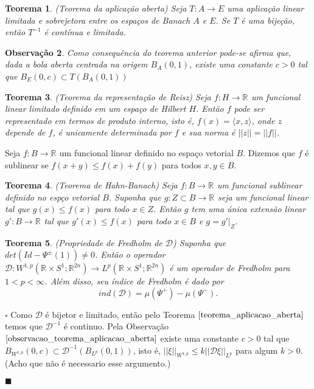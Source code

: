 \documentclass[12pt]{book}
\newtheorem{teorema}{Teorema}[section]
\newtheorem{observacao}[teorema]{Observação}
\newenvironment{prova}[1]{$\square$ #1}{\hfill$\blacksquare$}
\newcommand{\circulo}{S^{1}}
\newcommand{\diferencialmapafloerabrev}{\mathcal{D}}
\newcommand{\espacoLpcontradominio}[2]{L^{p}(#1;#2)}
\newcommand{\espacosobolevcontradominio}[2]{W^{1,p}(#1;#2)}
\newcommand{\norma}[1]{||#1||}
\newcommand{\normaLp}[1]{||#1||_{L^{p}}}
\newcommand{\normaWp}[1]{||#1||_{W^{1,p}}}
\newcommand{\produtointerno}[2]{\langle #1, #2 \rangle}
\newcommand{\retacartesianocirculo}{\real{} \times \circulo}
\newcommand{\real}[1]{\mathbb{R}^{#1}}
\newcommand{\reta}{\real{}}
\newcommand{\vermelho}[1]{{\color{red}#1}}
\begin{document}
	\begin{teorema}\label{teorema_aplicacao_aberta}
		(Teorema da aplicação aberta) Seja $T : A \to E$ uma aplicação linear limitada e sobrejetora entre os espaços de Banach $A$ e $E$. Se $T$ é uma bijeção, então $T^{-1}$ é contínua e limitada.
	\end{teorema}
	
	\begin{observacao}\label{observacao_teorema_aplicacao_aberta}
		Como consequência do teorema anterior pode-se afirma que, dada a bola aberta centrada na origem $B_{A}(0,1)$, existe uma constante $c>0$ tal que $B_{E}(0,c)\subset T(B_{A}(0,1))$
	\end{observacao}
	
	\begin{teorema}
		(Teorema da representação de Reisz) Seja $f:H \to \reta$ um funcional linear limitado definido em um espaço de Hilbert $H$. Então $f$ pode ser representado em termos de produto interno, isto é, $f(x) = \produtointerno{x}{z}$, onde $z$ depende de $f$, é unicamente determinada por $f$ e sua norma é $\norma{z} = \norma{f}$.
	\end{teorema}
	
	Seja $f: B \to \reta$ um funcional linear definido no espaço vetorial $B$. Dizemos que $f$ é sublinear se $f(x+y)\leq f(x)+f(y)$ para todos $x,y \in B$.
	
	\begin{teorema}
		(Teorema de Hahn-Banach) Seja $f:B \to \reta$ um funcional sublinear definido no espço vetorial $B$. Suponha que $g:Z \subset B \to \reta$ seja um funcional linear tal que $g(x)\leq f(x)$ para todo $x \in Z$. Então $g$ tem uma única extensão linear $g': B \to \reta$ tal que $g'(x)\leq f(x)$ para todo $x \in B$ e $g=g'|_{Z}$.
	\end{teorema}
	
	\begin{teorema}
		(Propriedade de Fredholm de $\diferencialmapafloerabrev$) Suponha que $det(Id - \Psi^{\pm}(1)) \neq 0$. Então o operador $\diferencialmapafloerabrev: \espacosobolevcontradominio{\retacartesianocirculo}{\real{2n}} \to \espacoLpcontradominio{\retacartesianocirculo}{\real{2n}}$ é um operador de Fredholm para $1<p<\infty$. Além disso, seu índice de Fredholm é dado por
		$$
		ind(\diferencialmapafloerabrev) = \mu(\Psi^{+}) - \mu(\Psi^{-}).
		$$
	\end{teorema}
	\begin{prova}
		\vermelho{	Como $\diferencialmapafloerabrev$ é bijetor e limitado, então pelo Teorema $\ref{teorema_aplicacao_aberta}$ temos que $\diferencialmapafloerabrev^{-1}$ é continuo. Pela Observação $\ref{observacao_teorema_aplicacao_aberta}$ existe uma constante $c>0$ tal que $B_{W^{1,p}}(0,c)\subset\diferencialmapafloerabrev^{-1}(B_{L^{p}}(0,1))$, isto é, $\normaWp{\xi} \leq k \normaLp{\diferencialmapafloerabrev\xi}$ para algum $k>0$.(Acho que não é necessario esse argumento.)}
		
		
	\end{prova}
	
\end{document}
